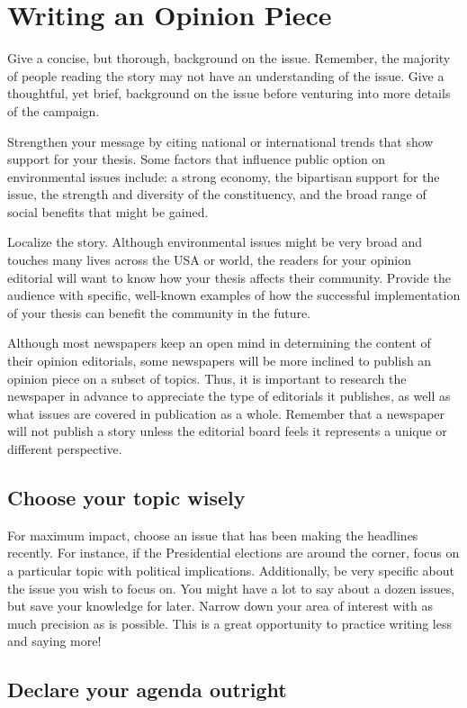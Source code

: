 \documentclass{tufte-handout}\usepackage[]{graphicx}\usepackage[]{color}
\begin{document}
\section{Writing an Opinion Piece}
Give a concise, but thorough, background on the issue. Remember, the majority of people reading the story may not have an understanding of the issue. Give a thoughtful, yet brief, background on the issue before venturing into more details of the campaign.

Strengthen your message by citing national or international trends that show support for your thesis. Some factors  that influence public option on environmental issues include: a strong economy, the bipartisan support for the issue, the strength and diversity of the constituency, and the broad range of social benefits that might be gained.

Localize the story. Although environmental issues might be very broad and touches many lives across the USA or world, the readers for your opinion editorial will want to know how your thesis affects their community. Provide the audience with specific, well-known examples of how the successful implementation of your thesis can benefit the community in the future.


Although most newspapers keep an open mind in determining the content of their opinion editorials, some newspapers will be more inclined to publish an opinion piece on a subset of topics. Thus, it is important to research the newspaper in advance to appreciate the type of editorials it publishes, as well as what issues are covered in publication as a whole. Remember that a newspaper will not publish a story unless the editorial board feels it represents a unique or different perspective.

\subsection{Choose your topic wisely}

For maximum impact, choose an issue that has been making the headlines recently. For instance, if the Presidential elections are around the corner, focus on a particular topic with political implications. Additionally, be very specific about the issue you wish to focus on. You might have a lot to say about a dozen issues, but save your knowledge for later. Narrow down your area of interest with as much precision as is possible. This is a great opportunity to practice writing less and saying more!

\subsection{Declare your agenda outright}
\end{document}
